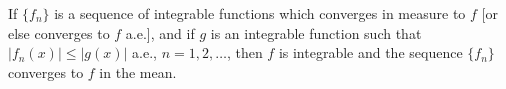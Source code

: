 If $\{f_n\}$ is a sequence of integrable functions which converges in measure to $f$ [or else converges to $f$ a.e.], and if $g$ is an integrable function such that $|f_n(x)| \leq |g(x)|$ a.e., $n = 1, 2, \dots$, then $f$ is integrable and the sequence $\{f_n\}$ converges to $f$ in the mean.
